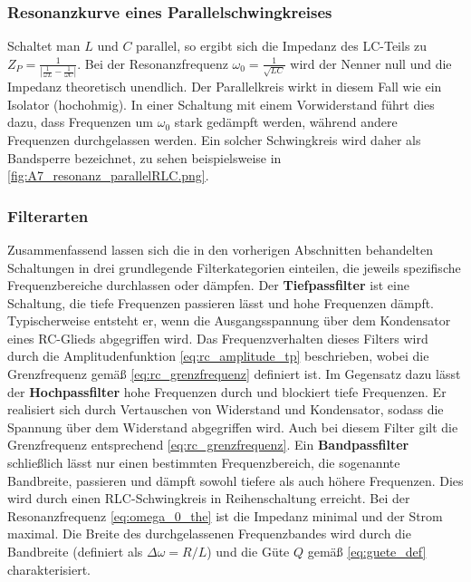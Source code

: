 \subsubsection{Resonanzkurve eines Parallelschwingkreises}
Schaltet man \(L\) und \(C\) parallel, so ergibt sich die Impedanz des LC-Teils zu \(Z_P = \frac{1}{| \frac{1}{\omega L} - \frac{1}{\omega C} |}\). Bei der Resonanzfrequenz \(\omega_0 = \frac{1}{\sqrt{LC}}\) wird der Nenner null und die Impedanz theoretisch unendlich. Der Parallelkreis wirkt in diesem Fall wie ein Isolator (hochohmig). In einer Schaltung mit einem Vorwiderstand führt dies dazu, dass Frequenzen um \(\omega_0\) stark gedämpft werden, während andere Frequenzen durchgelassen werden. Ein solcher Schwingkreis wird daher als Bandsperre bezeichnet, zu sehen beispielsweise in \cref{fig:A7_resonanz_parallelRLC.png}. 

\subsubsection{Filterarten}
\label{sec:FilterUebersicht}
Zusammenfassend lassen sich die in den vorherigen Abschnitten behandelten Schaltungen in drei grundlegende Filterkategorien einteilen, die jeweils spezifische Frequenzbereiche durchlassen oder dämpfen.
Der \textbf{Tiefpassfilter} ist eine Schaltung, die tiefe Frequenzen passieren lässt und hohe Frequenzen dämpft. Typischerweise entsteht er, wenn die Ausgangsspannung über dem Kondensator eines RC-Glieds abgegriffen wird. Das Frequenzverhalten dieses Filters wird durch die Amplitudenfunktion \cref{eq:rc_amplitude_tp} beschrieben, wobei die Grenzfrequenz gemäß \cref{eq:rc_grenzfrequenz} definiert ist.
Im Gegensatz dazu lässt der \textbf{Hochpassfilter} hohe Frequenzen durch und blockiert tiefe Frequenzen. Er realisiert sich durch Vertauschen von Widerstand und Kondensator, sodass die Spannung über dem Widerstand abgegriffen wird. Auch bei diesem Filter gilt die Grenzfrequenz entsprechend \cref{eq:rc_grenzfrequenz}.
Ein \textbf{Bandpassfilter} schließlich lässt nur einen bestimmten Frequenzbereich, die sogenannte Bandbreite, passieren und dämpft sowohl tiefere als auch höhere Frequenzen. Dies wird durch einen RLC-Schwingkreis in Reihenschaltung erreicht. Bei der Resonanzfrequenz \cref{eq:omega_0_the} ist die Impedanz minimal und der Strom maximal. Die Breite des durchgelassenen Frequenzbandes wird durch die Bandbreite (definiert als \(\Delta \omega = R/L\)) und die Güte \(Q\) gemäß \cref{eq:guete_def} charakterisiert.
\newpage



